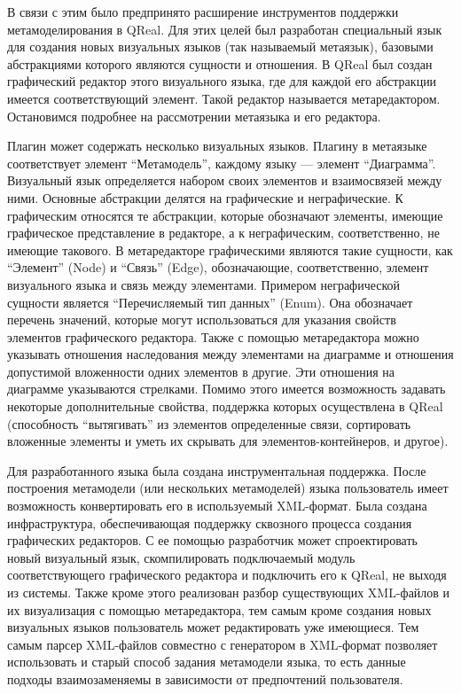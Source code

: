 \documentclass[a4paper]{article}
\begin{document}
В связи с этим было предпринято расширение инструментов поддержки метамоделирования в QReal. Для этих целей был разработан специальный язык для создания новых визуальных языков (так называемый метаязык), базовыми абстракциями которого являются сущности и отношения. В QReal был создан графический редактор этого визуального языка, где для каждой его абстракции имеется соответствующий элемент. Такой редактор называется метаредактором. Остановимся подробнее на рассмотрении метаязыка и его редактора. 

Плагин может содержать несколько визуальных языков. Плагину в метаязыке соответствует элемент ``Метамодель'', каждому языку --- элемент ``Диаграмма''. Визуальный язык определяется набором своих элементов и взаимосвязей между ними. Основные абстракции делятся на графические и неграфические. К графическим относятся те абстракции, которые обозначают элементы, имеющие графическое представление в редакторе, а к неграфическим, соответственно, не имеющие такового. В метаредакторе графическими являются такие сущности, как ``Элемент'' (Node) и ``Связь'' (Edge), обозначающие, соответственно, элемент визуального языка и связь между элементами. Примером неграфической сущности является ``Перечисляемый тип данных'' (Enum). Она обозначает перечень значений, которые могут использоваться для указания свойств элементов графического редактора. Также с помощью метаредактора можно указывать отношения наследования между элементами на диаграмме и отношения допустимой вложенности одних элементов в другие. Эти отношения на диаграмме указываются стрелками. Помимо этого имеется возможность задавать некоторые дополнительные свойства, поддержка которых осуществлена в QReal (способность “вытягивать” из элементов определенные связи, сортировать вложенные элементы и уметь их скрывать для элементов-контейнеров, и другое). 

Для разработанного языка была создана инструментальная поддержка. После построения метамодели (или нескольких метамоделей) языка пользователь имеет возможность конвертировать его в используемый XML-формат. Была создана инфраструктура, обеспечивающая поддержку сквозного процесса создания графических редакторов. С ее помощью разработчик может спроектировать новый визуальный язык, скомпилировать подключаемый модуль соответствующего графического редактора и подключить его к QReal, не выходя из системы. Также кроме этого реализован разбор существующих XML-файлов и их визуализация с помощью метаредактора, тем самым кроме создания новых визуальных языков пользователь может редактировать уже имеющиеся. Тем самым парсер XML-файлов совместно с генератором в XML-формат позволяет использовать и старый способ задания метамодели языка, то есть данные подходы взаимозаменяемы в зависимости от предпочтений пользователя.
\end{document}
